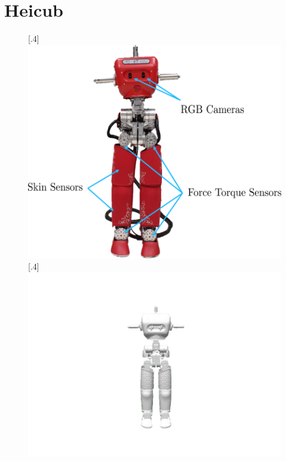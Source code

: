 \section{Heicub}
\label{sec::34_he}


\begin{figure}[h!]
	\centering
	\subcaptionbox{}%
	[.4\linewidth]{\includegraphics[scale=.3]{chapters/03_methods/img/heicub.png}}
	\subcaptionbox{}%
	[.4\linewidth]{\includegraphics[scale=.3]{chapters/03_methods/img/gazebo_heicub.png}}
	\subcaptionbox{}%

\end{figure}
